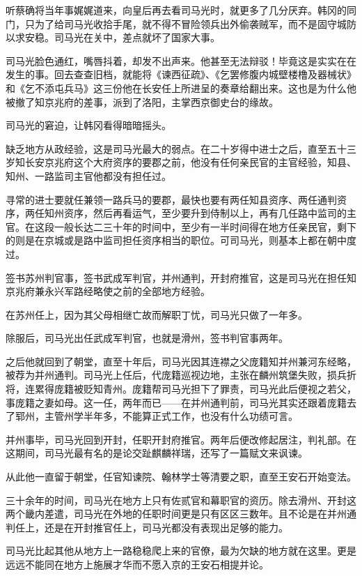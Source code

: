 听蔡确将当年事娓娓道来，向皇后再去看司马光时，就更多了几分厌弃。韩冈的同门，只为了给司马光收拾手尾，就不得不冒险领兵出外偷袭贼军，而不是固守城防以求安稳。司马光在关中，差点就坏了国家大事。 

司马光脸色通红，嘴唇抖着，却发不出声来。他甚至无法辩驳！毕竟这是实实在在发生的事。回去查查旧档，就能将《谏西征疏》、《乞罢修腹内城壁楼橹及器械状》和《乞不添屯兵马》这三份他在长安任上所进呈的奏章给翻出来。这也是为什么他被撤了知京兆府的差事，派到了洛阳，主掌西京御史台的缘故。 

司马光的窘迫，让韩冈看得暗暗摇头。 

缺乏地方从政经验，这是司马光最大的弱点。在二十岁得中进士之后，直至五十三岁知长安京兆府这个大府资序的要郡之前，他没有任何亲民官的主官经验，知县、知州、一路监司主官他都没有担任过。 

寻常的进士要就任兼领一路兵马的要郡，最快也要有两任知县资序、两任通判资序，两任知州资序，然后再看运气，至少要升到侍制以上，再有几任路中监司的主官。在这段一般长达二三十年的时间中，至少有一半时间得在地方任亲民官，剩下的则是在京城或是路中监司担任资序相当的职位。可司马光，则基本上都在朝中度过。 

签书苏州判官事，签书武成军判官，并州通判，开封府推官，这是司马光在担任知京兆府兼永兴军路经略使之前的全部地方经验。 

在苏州任上，因为其父母相继亡故而解职丁忧，司马光只做了一年多。 

除服后，司马光出任武成军判官，也就是滑州，签书判官事两年。 

之后他就回到了朝堂，直至十年后，司马光因其连襟之父庞籍知并州兼河东经略，被荐为并州通判。司马光上任后，代庞籍巡视边地，主张在麟州筑堡失败，损兵折将，连累得庞籍被贬知青州。庞籍帮司马光担下了罪责，司马光此后便视之若父，事庞籍之妻如母。这一任，两年而已——在并州通判前，司马光其实还跟着庞籍去了郓州，主管州学半年多，不能算正式工作，也没有什么功绩可言。 

并州事毕，司马光回到开封，任职开封府推官。两年后便改修起居注，判礼部。在这期间，司马光最有名的是论交趾麒麟祥瑞，还写了一篇赋文来讽谏。 

从此他一直留于朝堂，任官知谏院、翰林学士等清要之职，直至王安石开始变法。 

三十余年的时间，司马光在地方上只有佐贰官和幕职官的资历。除去滑州、开封这两个畿内差遣，司马光在外地的任职时间更是只有区区三数年。且不论是在并州通判任上，还是在开封推官任上，司马光都没有表现出足够的能力。 

司马光比起其他从地方上一路稳稳爬上来的官僚，最为欠缺的地方就在这里。更是远远不能同在地方上施展才华而不愿入京的王安石相提并论。 


